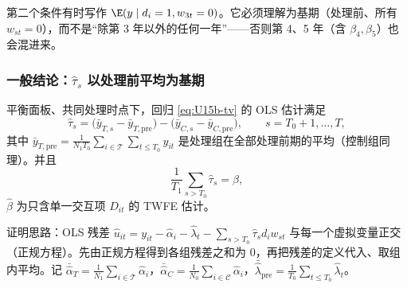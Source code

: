 \begin{note}
第二个条件有时写作 $\E(y\mid d_i=1,w_{3t}=0)$。它必须理解为基期（处理前、所有 $w_{st}=0$），而不是“除第 3 年以外的任何一年”——否则第 4、5 年（含 $\beta_4,\beta_5$）也会混进来。
\end{note}

\subsubsection{一般结论：\texorpdfstring{$\hat\tau_s$}{tau\_s hat} 以处理前平均为基期}

\begin{thm}\label{thm:U15b-tv}
平衡面板、共同处理时点下，回归 \eqref{eq:U15b-tv} 的 OLS 估计满足
\[
\hat\tau_s=\bigl(\bar y_{T,s}-\bar y_{T,\mathrm{pre}}\bigr)-\bigl(\bar y_{C,s}-\bar y_{C,\mathrm{pre}}\bigr),\qquad s=T_0+1,\dots,T,
\]
其中 $\bar y_{T,\mathrm{pre}}=\frac{1}{N_1T_0}\sum_{i\in\mathcal T}\sum_{t\le T_0}y_{it}$ 是处理组在全部处理前期的平均（控制组同理）。并且
\[
\frac1{T_1}\sum_{s>T_0}\hat\tau_s=\hat\beta,
\]
$\hat\beta$ 为只含单一交互项 $D_{it}$ 的 TWFE 估计。
\end{thm}

证明思路：OLS 残差 $\hat u_{it}=y_{it}-\hat\alpha_i-\hat\lambda_t-\sum_{s>T_0}\hat\tau_s d_iw_{st}$ 与每一个虚拟变量正交（正规方程）。先由正规方程得到各组残差之和为 0，再把残差的定义代入、取组内平均。记 $\bar{\hat\alpha}_T=\frac1{N_1}\sum_{i\in\mathcal T}\hat\alpha_i$，$\bar{\hat\alpha}_C=\frac1{N_0}\sum_{i\in\mathcal C}\hat\alpha_i$，$\bar{\hat\lambda}_{\mathrm{pre}}=\frac1{T_0}\sum_{t\le T_0}\hat\lambda_t$。

